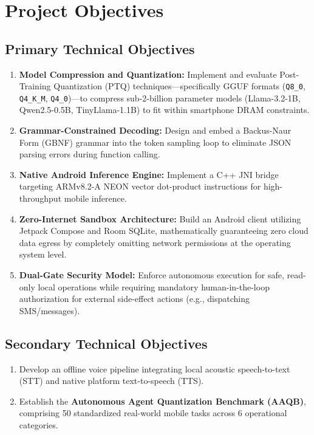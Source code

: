 \documentclass[12pt,a4paper,oneside]{report}
\begin{document}
\section{Project Objectives}
\subsection{Primary Technical Objectives}
\begin{enumerate}
    \item \textbf{Model Compression and Quantization:} Implement and evaluate Post-Training Quantization (PTQ) techniques—specifically GGUF formats (\texttt{Q8\_0}, \texttt{Q4\_K\_M}, \texttt{Q4\_0})—to compress sub-2-billion parameter models (Llama-3.2-1B, Qwen2.5-0.5B, TinyLlama-1.1B) to fit within smartphone DRAM constraints.
    \item \textbf{Grammar-Constrained Decoding:} Design and embed a Backus-Naur Form (GBNF) grammar into the token sampling loop to eliminate JSON parsing errors during function calling.
    \item \textbf{Native Android Inference Engine:} Implement a C++ JNI bridge targeting ARMv8.2-A NEON vector dot-product instructions for high-throughput mobile inference.
    \item \textbf{Zero-Internet Sandbox Architecture:} Build an Android client utilizing Jetpack Compose and Room SQLite, mathematically guaranteeing zero cloud data egress by completely omitting network permissions at the operating system level.
    \item \textbf{Dual-Gate Security Model:} Enforce autonomous execution for safe, read-only local operations while requiring mandatory human-in-the-loop authorization for external side-effect actions (e.g., dispatching SMS/messages).
\end{enumerate}

\subsection{Secondary Technical Objectives}
\begin{enumerate}
    \item Develop an offline voice pipeline integrating local acoustic speech-to-text (STT) and native platform text-to-speech (TTS).
    \item Establish the \textbf{Autonomous Agent Quantization Benchmark (AAQB)}, comprising 50 standardized real-world mobile tasks across 6 operational categories.
\end{enumerate}
\end{document}
